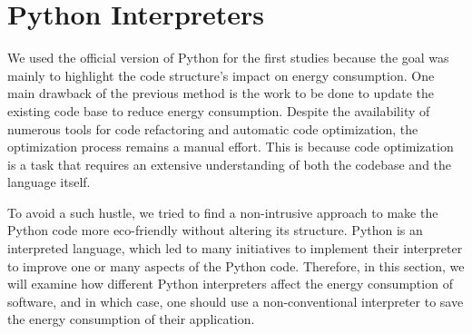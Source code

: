 \section{Python Interpreters}\label{python:sec_interpreters}
We used the official version of Python for the first studies because the goal was mainly to highlight the code structure's impact on energy consumption.
One main drawback of the previous method is the work to be done to update the existing code base to reduce energy consumption.
Despite the availability of numerous tools for code refactoring and automatic code optimization, the optimization process remains a manual effort. This is because code optimization is a task that requires an extensive understanding of both the codebase and the language itself.

To avoid a such hustle, we tried to find a non-intrusive approach to make the Python code more eco-friendly without altering its structure.
Python is an interpreted language, which led to many initiatives to implement their interpreter to improve one or many aspects of the Python code. 
Therefore, in this section, we will examine how different Python interpreters affect the energy consumption of software, and in which case, one should use a non-conventional interpreter to save the energy consumption of their application. 

